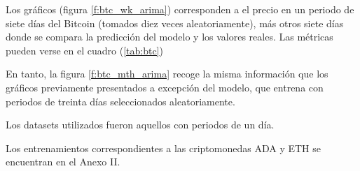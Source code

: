 \documentclass[a4paper,10pt]{article}
\begin{document}
Los gráficos (figura \ref{f:btc_wk_arima}) corresponden a el precio en un periodo de siete días del Bitcoin (tomados diez veces aleatoriamente), más otros siete días donde se compara la predicción del modelo y los valores reales. Las métricas pueden verse en el cuadro (\ref{tab:btc})

En tanto, la figura \ref{f:btc_mth_arima} recoge la misma información que los gráficos previamente presentados a excepción del modelo, que entrena con periodos de treinta días seleccionados aleatoriamente.

Los datasets utilizados fueron aquellos con periodos de un día.

Los entrenamientos correspondientes a las criptomonedas ADA y ETH se encuentran en el Anexo II.

\begin{figure}[H]
 \centering
   \\
    \\

\end{figure}
\end{document}
